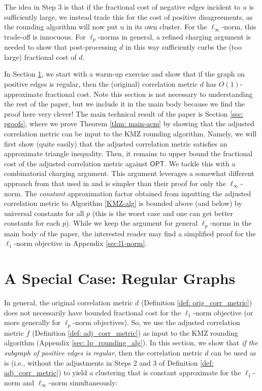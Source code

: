 \documentclass[11pt]{article}
\begin{document}
The idea in Step 3 is that if the fractional cost of negative edges incident to $u$ is sufficiently large, we instead trade this for the cost of positive disagreements, as 
the rounding algorithm will now put $u$ in its own cluster.
For the $\ell_\infty$-norm, this trade-off is innocuous.
For $\ell_p$-norms in general, a refined charging argument is needed to show that post-processing $d$ in this way sufficiently curbs the (too large) fractional cost of $d$.

In Section \ref{sec: regular_warmup}, we start with a warm-up exercise 
and show that if the graph on positive edges is regular, then 
the (original) correlation metric $d$ has $O(1)$-approximate fractional cost.
Note this section is not necessary to understanding the rest of the paper, 
but we include it in the main body because we find the proof here very clever!
The main technical result of the paper is Section \ref{sec: proofs}, where we prove Theorem \ref{thm: main-acm} 
by showing that the adjusted correlation metric can be input to the KMZ rounding algorithm.
Namely, we will first show (quite easily) that the adjusted correlation metric satisfies an approximate triangle inequality.
Then, it remains to upper bound the fractional cost of the adjusted correlation metric against $\textsf{OPT}$.
We tackle this with a combinatorial charging argument.   This argument leverages a somewhat different approach from that used in \cite{DMN23} and is simpler than their proof for only the $\ell_\infty$-norm.
The \textit{constant} approximation factor obtained from inputting the adjusted correlation metric to Algorithm \ref{KMZ-alg} is bounded above (and below) by universal constants for all $p$ (this is the worst case and one can get better constants for each $p$).
While we keep the argument for general $\ell_p$-norms in the main body of the paper,
the interested reader may find a simplified proof for the $\ell_1$-norm objective in Appendix \ref{sec:l1-norm}.



\section{A Special Case: Regular Graphs} \label{sec: regular_warmup}
In general, the original correlation metric $d$ (Definition \ref{def: orig_corr_metric}) does not necessarily have bounded fractional cost for the $\ell_1$-norm objective (or more generally for $\ell_p$-norm objectives). So, we use the adjusted correlation metric $f$ (Definition \ref{def: adj_corr_metric}) as input to the KMZ rounding algorithm (Appendix \ref{sec: lp_rounding_alg}). In this section, we show that \textit{if the subgraph of positive edges is regular}, then the correlation metric $d$ can be used as is (i.e., without the adjustments in Steps 2 and 3 of Definition \ref{def: adj_corr_metric}) to yield a clustering that is constant approximate for the $\ell_1$-norm and $\ell_{\infty}$-norm simultaneously:
\end{document}
